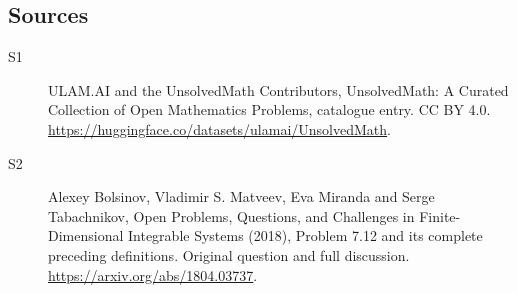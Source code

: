 \documentclass[11pt]{article}
\begin{document}
\subsection{Sources}
\begin{description}
\item[\hypertarget{source:statement:1}{S1}] ULAM.AI and the UnsolvedMath Contributors, UnsolvedMath: A Curated Collection of Open Mathematics Problems, catalogue entry. CC BY 4.0. \url{https://huggingface.co/datasets/ulamai/UnsolvedMath}.
\item[\hypertarget{source:statement:2}{S2}] Alexey Bolsinov, Vladimir S. Matveev, Eva Miranda and Serge Tabachnikov, Open Problems, Questions, and Challenges in Finite-Dimensional Integrable Systems (2018), Problem 7.12 and its complete preceding definitions. Original question and full discussion. \url{https://arxiv.org/abs/1804.03737}.

\end{description}
\label{end:statement}
\end{document}
